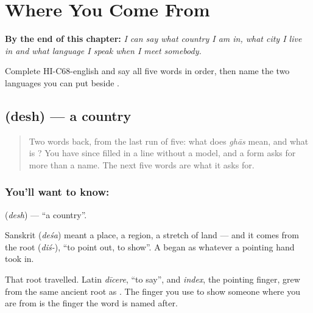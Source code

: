 
\chapter{Where You Come From}
\label{ch:hi-where-you-come-from}

\begin{chapteropening}
\textbf{By the end of this chapter:} \emph{I can say what country I am in, what city I live in and what language I speak when I meet somebody.}

Complete HI-C68-english and say all five words in order, then name the two languages you can put beside .
\end{chapteropening}

\section[desh]{ (desh) — a country}

\label{lesson:HI-C68-country}



\begin{quote}
Two words back, from the last run of five: what does \emph{ghās} mean, and what is \textbf{}? You have since filled in a  line without a model, and a form asks for more than a name. The next five words are what it asks for.
\end{quote}

\subsection*{You'll want to know: }
\textbf{} (\emph{desh}) — \textquotedblleft{}a country\textquotedblright{}.

Sanskrit  (\emph{deśa}) meant a place, a region, a stretch of land — and it comes from the root  (\emph{diś-}), \textquotedblleft{}to point out, to show\textquotedblright{}. A  began as whatever a pointing hand took in.

That root travelled. Latin \emph{dīcere}, \textquotedblleft{}to say\textquotedblright{}, and \emph{index}, the pointing finger, grew from the same ancient root as . The finger you use to show someone where you are from is the finger the word is named after.

